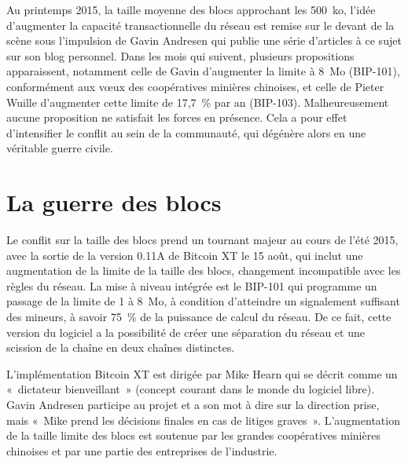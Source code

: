 Au printemps 2015, la taille moyenne des blocs approchant les 500~ko, l'idée d'augmenter la capacité transactionnelle du réseau est remise sur le devant de la scène sous l'impulsion de Gavin Andresen qui publie une série d'articles à ce sujet sur son blog personnel. Dans les mois qui suivent, plusieurs propositions apparaissent, notamment celle de Gavin d'augmenter la limite à 8~Mo (BIP-101), conformément aux vœux des coopératives minières chinoises, et celle de Pieter Wuille d'augmenter cette limite de 17,7~\% par an (BIP-103). Malheureusement aucune proposition ne satisfait les forces en présence. Cela a pour effet d'intensifier le conflit au sein de la communauté, qui dégénère alors en une véritable guerre civile.

\section*{La guerre des blocs} %

Le conflit sur la taille des blocs prend un tournant majeur au cours de l'été 2015, avec la sortie de la version 0.11A de Bitcoin XT le 15 août, qui inclut une augmentation de la limite de la taille des blocs, changement incompatible avec les règles du réseau. La mise à niveau intégrée est le BIP-101 qui programme un passage de la limite de 1 à 8~Mo, à condition d'atteindre un signalement suffisant des mineurs, à savoir 75~\% de la puissance de calcul du réseau. De ce fait, cette version du logiciel a la possibilité de créer une séparation du réseau et une scission de la chaîne en deux chaînes distinctes.

L'implémentation Bitcoin XT est dirigée par Mike Hearn qui se décrit comme un «~dictateur bienveillant~» (concept courant dans le monde du logiciel libre). Gavin Andresen participe au projet et a son mot à dire sur la direction prise, mais «~Mike prend les décisions finales en cas de litiges graves~». L'augmentation de la taille limite des blocs est soutenue par les grandes coopératives minières chinoises et par une partie des entreprises de l'industrie.

